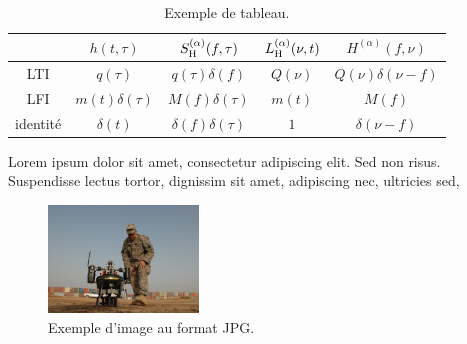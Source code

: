 \begin{table}[ht]
  \begin{center}
    \begin{tabular}{|c|c|c|c|c|}
      \hline
      & $h(t,\tau)$ & $S_{\mathrm{H}}^{(\alpha)} (f,\tau)$ & $L_{\mathrm{H}}^{(\alpha)} (\nu,t)$ & $H^{(\alpha)}(f,\nu)$ \\
      \hline
      LTI & $q(\tau)$ & $q(\tau) \delta(f)$ & $Q(\nu)$ & $Q(\nu) \delta(\nu-f)$ \\
      \hline
      LFI & $m(t) \delta(\tau)$ & $M(f) \delta(\tau)$ & $m(t)$ & $M(f)$\\
      \hline
      identité & $\delta(t)$ & $\delta(f)\delta(\tau)$ & $1$ & $\delta(\nu-f)$\\
      \hline
    \end{tabular}
    \caption{Exemple de tableau.}
    \label{tab:un-tableau}
  \end{center}
\end{table}

Lorem ipsum dolor sit amet, consectetur adipiscing elit. Sed non risus. Suspendisse lectus tortor, dignissim sit amet, adipiscing nec, ultricies sed, 
\begin{figure}[htp]
  \centering
  \includegraphics[width=4cm]{images/bitmap_image}
  \caption{Exemple d'image au format JPG.}
  \label{fig:une-autre-image}
\end{figure}



